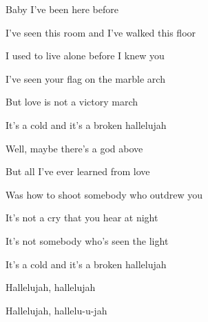 \begin{song}
\bigskip

\Chorus

\bigskip

Baby I've been here before \par
I've seen this room and I've walked this floor \par
I used to live alone before I knew you  \par
I've seen your flag on the marble arch \par
But love is not a victory march \par
It's a cold and it's a broken hallelujah \par

\bigskip

\Chorus

\bigskip

Well, maybe there's a god above \par
But all I've ever learned from love \par
Was how to shoot somebody who outdrew you  \par
It's not a cry that you hear at night \par
It's not somebody who's seen the light \par
It's a cold and it's a broken hallelujah \par

\bigskip

Hallelujah, hallelujah \par
Hallelujah, hallelu-u-jah \par

\end{song}